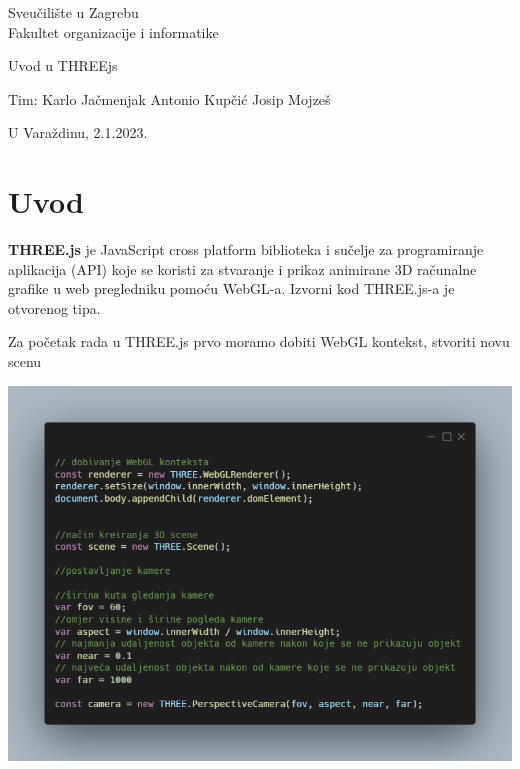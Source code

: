 \documentclass[a4paper,12pt]{article}
\begin{document}
\thispagestyle{empty}
\begin{center}
Sveučilište u Zagrebu\\
Fakultet organizacije i informatike
\end{center}
\vfill
\begin{center}
\Large Uvod u THREEjs
\end{center}
\vfill
\begin{flushright}
Tim: Karlo Jačmenjak \break
Antonio Kupčić \break
Josip Mojzeš \break
\end{flushright}
U Varaždinu, 2.1.2023. 

\newpage
\setcounter{page}{1}

\section{Uvod}
\textbf{THREE.js} je JavaScript cross platform biblioteka i sučelje za programiranje aplikacija (API) koje se koristi za stvaranje i prikaz animirane 3D računalne grafike u web pregledniku pomoću WebGL-a. Izvorni kod THREE.js-a je otvorenog tipa.

\begin{flushleft}
    Za početak rada u THREE.js prvo moramo dobiti WebGL kontekst, stvoriti novu scenu 
\end{flushleft}


\begin{center}
    \includegraphics[scale=0.5]{image/zadatak1.png}
\end{center}
\end{document}
